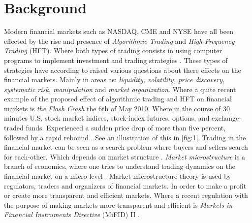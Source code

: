\documentclass{kththesis}
\theoremstyle{definition}
\begin{document}
\section{Background}
Modern financial markets such as NASDAQ, CME and NYSE have all been effected by the rise and presence of \textit{Algorithmic Trading} and \textit{High-Frequency Trading} (HFT).  Where both types of trading consists in using computer programs to implement investment and trading strategies \parencite{abergel2012market}. These types of strategies have according to \textcite{abergel2012market, o2015high} raised various questions about there effects on the financial markets. Mainly in areas as: \textit{liquidity, volatility, price discovery, systematic risk, manipulation} and \textit{market organization}. Where a quite recent example of the proposed effect of algorithmic trading and HFT on financial markets is \textit{the Flash Crash} the 6th of May 2010. Where in the course of 30 minutes U.S. stock market indices, stock-index futures, options, and exchange-traded funds. Experienced a sudden price drop of more than five percent, followed by a rapid rebound \parencite{kirilenko2011flash,kirilenko2017flash}. See an illustration of this in \autoref{fig:1}.
\newline
\newline
Trading in the financial market can be seen as a search problem where buyers and sellers search for each-other. Which depends on market structure \parencite{abergel2012market}. \textit{Market microstructure} is a branch of economics, where one tries to understand trading dynamics on the financial market on a micro level \parencite{o1995market, hasbrouck2007empirical}. Market microstructure theory is used by regulators, traders and organizers of financial markets. In order to make a profit or create more transparent and efficient markets. Where a recent regulation with the purpose of making markets more transparent and efficient is \textit{Markets in Financial Instruments Directive} (MiFID) II \parencite{busch2016mifid}.
\end{document}
